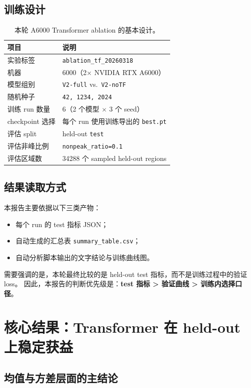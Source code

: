 \documentclass[11pt,a4paper]{ctexart}
\begin{document}
\subsection{训练设计}

\begin{table}[H]
\centering
\small
\caption{本轮 A6000 Transformer ablation 的基本设计。}
\begin{tabular}{ll}
\toprule
项目 & 说明 \\
\midrule
实验标签 & \texttt{ablation\_tf\_20260318} \\
机器 & 6000（2$\times$ NVIDIA RTX A6000） \\
模型组别 & \texttt{V2-full} vs.\ \texttt{V2-noTF} \\
随机种子 & \texttt{42, 1234, 2024} \\
训练 run 数量 & 6（2 个模型 $\times$ 3 个 seed） \\
checkpoint 选择 & 每个 run 使用训练导出的 \texttt{best.pt} \\
评估 split & held-out \texttt{test} \\
评估非峰比例 & \texttt{nonpeak\_ratio=0.1} \\
评估区域数 & 34288 个 sampled held-out regions \\
\bottomrule
\end{tabular}
\end{table}

\subsection{结果读取方式}

本报告主要依据以下三类产物：
\begin{itemize}[leftmargin=2em]
  \item 每个 run 的 test 指标 JSON；
  \item 自动生成的汇总表 \texttt{summary\_table.csv}；
  \item 自动分析脚本输出的文字结论与训练曲线图。
\end{itemize}

需要强调的是，本轮最终比较的是 held-out test 指标，而不是训练过程中的验证 loss。
因此，本报告的判断优先级是：\textbf{test 指标 > 验证曲线 > 训练内选择口径}。

\section{核心结果：Transformer 在 held-out 上稳定获益}

\subsection{均值与方差层面的主结论}
\end{document}
